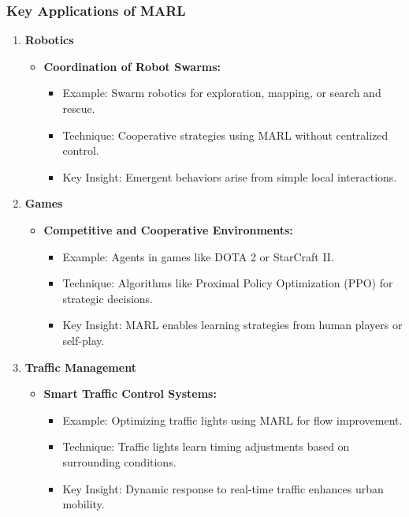 \documentclass[aspectratio=169]{beamer}
\begin{document}
\begin{frame}[fragile]
    \frametitle{Key Applications of MARL}
    \begin{enumerate}
        \item \textbf{Robotics}
        \begin{itemize}
            \item \textbf{Coordination of Robot Swarms:}
                \begin{itemize}
                    \item Example: Swarm robotics for exploration, mapping, or search and rescue.
                    \item Technique: Cooperative strategies using MARL without centralized control.
                    \item Key Insight: Emergent behaviors arise from simple local interactions.
                \end{itemize}
        \end{itemize}
        \item \textbf{Games}
        \begin{itemize}
            \item \textbf{Competitive and Cooperative Environments:}
                \begin{itemize}
                    \item Example: Agents in games like DOTA 2 or StarCraft II.
                    \item Technique: Algorithms like Proximal Policy Optimization (PPO) for strategic decisions.
                    \item Key Insight: MARL enables learning strategies from human players or self-play.
                \end{itemize}
        \end{itemize}
        \item \textbf{Traffic Management}
        \begin{itemize}
            \item \textbf{Smart Traffic Control Systems:}
                \begin{itemize}
                    \item Example: Optimizing traffic lights using MARL for flow improvement.
                    \item Technique: Traffic lights learn timing adjustments based on surrounding conditions.
                    \item Key Insight: Dynamic response to real-time traffic enhances urban mobility.
                \end{itemize}
        \end{itemize}
    \end{enumerate}
\end{frame}
\end{document}

